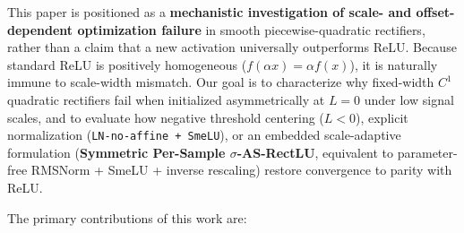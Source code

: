 \documentclass[11pt, a4paper]{article}
\begin{document}
This paper is positioned as a \textbf{mechanistic investigation of scale- and offset-dependent optimization failure} in smooth piecewise-quadratic rectifiers, rather than a claim that a new activation universally outperforms ReLU. Because standard ReLU is positively homogeneous ($f(\alpha x) = \alpha f(x)$), it is naturally immune to scale-width mismatch. Our goal is to characterize why fixed-width $C^{1}$ quadratic rectifiers fail when initialized asymmetrically at $L = 0$ under low signal scales, and to evaluate how negative threshold centering ($L < 0$), explicit normalization (\texttt{LN-no-affine + SmeLU}), or an embedded scale-adaptive formulation (\textbf{Symmetric Per-Sample $\sigma$-AS-RectLU}, equivalent to parameter-free RMSNorm + SmeLU + inverse rescaling) restore convergence to parity with ReLU.

The primary contributions of this work are:
\end{document}

